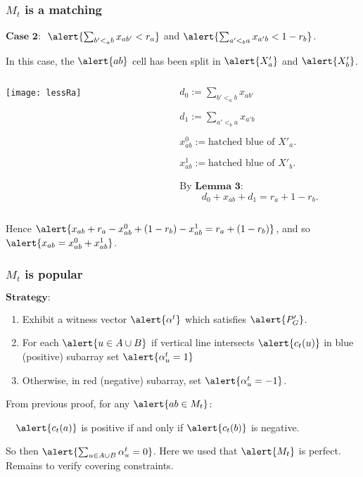 \documentclass[10pt]{beamer}
\begin{document}
\begin{frame}
\frametitle{$M_t$ is a matching}
$\textbf{Case 2: }$ $\alert{\sum_{b' <_a b} x_{ab'} < r_a}$ and $\alert{\sum_{a' <_b a} x_{a'b} < 1 - r_b}$.

In this case, the $\alert{ab}$ cell has been split in $\alert{X'_a}$ and $\alert{X'_b}$.
\begin{columns}[T] %
\begin{column}{.48\textwidth}
\texttt{[image: lessRa]}
\end{column}
\begin{column}{.48\textwidth}
$$ $$
$\quad\quad d_0:= \sum_{b' <_a b} x_{ab'} $

$\quad\quad d_1:=\sum_{a'<_b a} x_{a'b}$

$\quad\quad x^0_{ab} := \text{hatched blue of }X'_a.$

$\quad\quad x^1_{ab} := \text{hatched blue of }X'_b.$

$\quad\quad$By $\textbf{Lemma 3}$:
$$d_0 + x_{ab} + d_1 = r_a + 1-r_b.$$
\end{column}
\end{columns}
\centering
Hence $\alert{x_{ab} + r_a - x^0_{ab}  + (1-r_b) - x^1_{ab} = r_a + (1-r_b)}$, and so $\alert{x_{ab} = x^0_{ab} + x^1_{ab}}$.
\end{frame}
\begin{frame}
\frametitle{$M_t$ is popular}
$\textbf{Strategy:}$
\begin{enumerate}
\item Exhibit a witness vector $\alert{\alpha^t}$ which satisfies $\alert{P'_G}$.
\item For each $\alert{u \in A\cup B}$ if vertical line intersects $\alert{c_t(u)}$ in blue (positive) subarray set $\alert{\alpha^t_u = 1}$
\item Otherwise, in red (negative) subarray, set $\alert{\alpha^t_u = -1}$.
\end{enumerate}
From previous proof, for any $\alert{ab \in M_t}$:

$\quad\alert{c_t(a)}$ is positive if and only if $\alert{c_t(b)}$ is negative.

So then $\alert{\sum_{u \in A\cup B} \alpha^t_u = 0}$. Here we used that $\alert{M_t}$ is perfect. Remains to verify covering constraints.
\end{frame}
\end{document}
